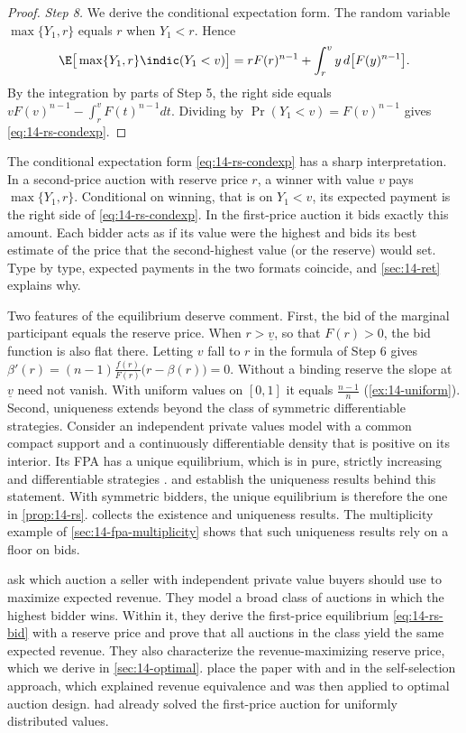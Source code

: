 \begin{proof}
\emph{Step 8.} We derive the conditional expectation form. The random variable $\max\{Y_1,r\}$ equals $r$ when $Y_1<r$. Hence
\[
\E\big[\max\{Y_1,r\}\indic(Y_1<v)\big]=rF(r)^{n-1}+\int_r^v y\,d\big[F(y)^{n-1}\big].
\]
By the integration by parts of Step 5, the right side equals $vF(v)^{n-1}-\int_r^vF(t)^{n-1}dt$. Dividing by $\Pr(Y_1<v)=F(v)^{n-1}$ gives \eqref{eq:14-rs-condexp}.
\end{proof}

The conditional expectation form \eqref{eq:14-rs-condexp} has a sharp interpretation. In a second-price auction with reserve price $r$, a winner with value $v$ pays $\max\{Y_1,r\}$. Conditional on winning, that is on $Y_1<v$, its expected payment is the right side of \eqref{eq:14-rs-condexp}. In the first-price auction it bids exactly this amount. Each bidder acts as if its value were the highest and bids its best estimate of the price that the second-highest value (or the reserve) would set. Type by type, expected payments in the two formats coincide, and \cref{sec:14-ret} explains why.

Two features of the equilibrium deserve comment. First, the bid of the marginal participant equals the reserve price. When $r>\underline v$, so that $F(r)>0$, the bid function is also flat there. Letting $v$ fall to $r$ in the formula of Step 6 gives $\beta'(r)=(n-1)\frac{f(r)}{F(r)}\big(r-\beta(r)\big)=0$. Without a binding reserve the slope at $\underline v$ need not vanish. With uniform values on $[0,1]$ it equals $\frac{n-1}{n}$ (\cref{ex:14-uniform}). Second, uniqueness extends beyond the class of symmetric differentiable strategies. Consider an independent private values model with a common compact support and a continuously differentiable density that is positive on its interior. Its FPA has a unique equilibrium, which is in pure, strictly increasing and differentiable strategies \citep[Theorem 2.1(ii)]{AtheyHaile2007}.  and \citet{MaskinRiley2003} establish the uniqueness results behind this statement. With symmetric bidders, the unique equilibrium is therefore the one in \cref{prop:14-rs}.  collects the existence and uniqueness results. The multiplicity example of \cref{sec:14-fpa-multiplicity} shows that such uniqueness results rely on a floor on bids.

 \citet{RileySamuelson1981} ask which auction a seller with independent private value buyers should use to maximize expected revenue. They model a broad class of auctions in which the highest bidder wins. Within it, they derive the first-price equilibrium \eqref{eq:14-rs-bid} with a reserve price and prove that all auctions in the class yield the same expected revenue. They also characterize the revenue-maximizing reserve price, which we derive in \cref{sec:14-optimal}.
 place the paper with \citet{HarrisRaviv1981} and \citet{Myerson1981} in the self-selection approach, which explained revenue equivalence and was then applied to optimal auction design.  had already solved the first-price auction for uniformly distributed values.

